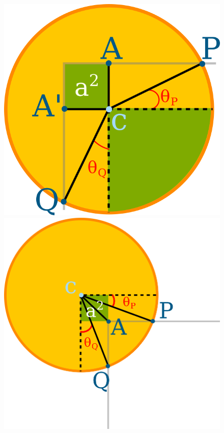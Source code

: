 \begin{figure}[h!]
	\begin{minipage}{0.5\textwidth}
	\center
	\includegraphics[scale=2.0]{figures/appendix-potential-elastica/balance-dev-1.png}
	\end{minipage}%
	\begin{minipage}{0.5\textwidth}
	\center
	\includegraphics[scale=2.0]{figures/appendix-potential-elastica/balance-dev-2.png}
	\end{minipage}	
\end{figure}

